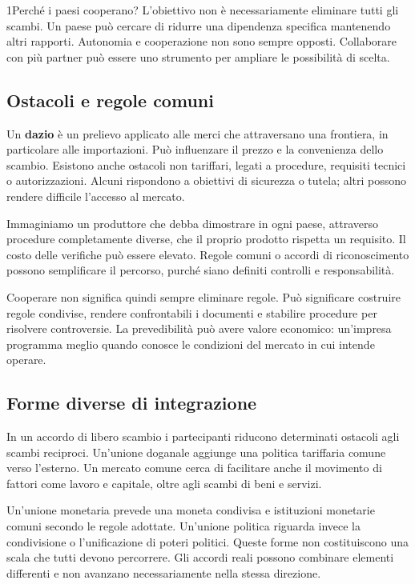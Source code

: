 \begin{lettura}{1}{Perché i paesi cooperano?}
L'obiettivo non è necessariamente eliminare tutti gli scambi. Un paese può cercare di ridurre una dipendenza specifica mantenendo altri rapporti. Autonomia e cooperazione non sono sempre opposti. Collaborare con più partner può essere uno strumento per ampliare le possibilità di scelta.

\subsection*{Ostacoli e regole comuni}
Un \textbf{dazio} è un prelievo applicato alle merci che attraversano una frontiera, in particolare alle importazioni. Può influenzare il prezzo e la convenienza dello scambio. Esistono anche ostacoli non tariffari, legati a procedure, requisiti tecnici o autorizzazioni. Alcuni rispondono a obiettivi di sicurezza o tutela; altri possono rendere difficile l'accesso al mercato.

Immaginiamo un produttore che debba dimostrare in ogni paese, attraverso procedure completamente diverse, che il proprio prodotto rispetta un requisito. Il costo delle verifiche può essere elevato. Regole comuni o accordi di riconoscimento possono semplificare il percorso, purché siano definiti controlli e responsabilità.

Cooperare non significa quindi sempre eliminare regole. Può significare costruire regole condivise, rendere confrontabili i documenti e stabilire procedure per risolvere controversie. La prevedibilità può avere valore economico: un'impresa programma meglio quando conosce le condizioni del mercato in cui intende operare.

\subsection*{Forme diverse di integrazione}
In un accordo di libero scambio i partecipanti riducono determinati ostacoli agli scambi reciproci. Un'unione doganale aggiunge una politica tariffaria comune verso l'esterno. Un mercato comune cerca di facilitare anche il movimento di fattori come lavoro e capitale, oltre agli scambi di beni e servizi.

Un'unione monetaria prevede una moneta condivisa e istituzioni monetarie comuni secondo le regole adottate. Un'unione politica riguarda invece la condivisione o l'unificazione di poteri politici. Queste forme non costituiscono una scala che tutti devono percorrere. Gli accordi reali possono combinare elementi differenti e non avanzano necessariamente nella stessa direzione.


\end{lettura}
